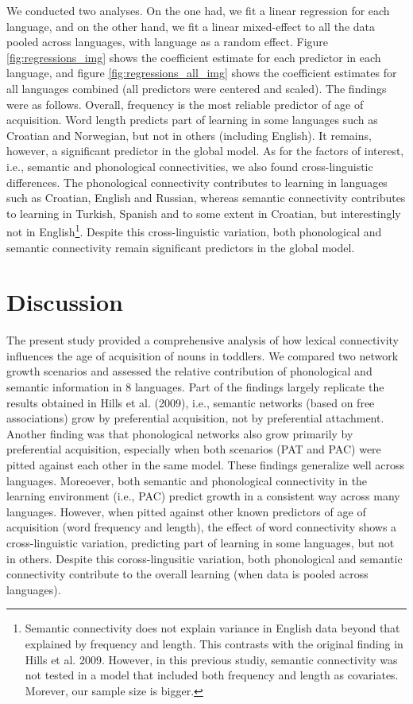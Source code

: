 \documentclass[10pt, letterpaper]{article}
\begin{document}
We conducted two analyses. On the one had, we fit a linear regression
for each language, and on the other hand, we fit a linear mixed-effect
to all the data pooled across languages, with language as a random
effect. Figure \ref{fig:regressions_img} shows the coefficient estimate
for each predictor in each language, and figure
\ref{fig:regressions_all_img} shows the coefficient estimates for all
languages combined (all predictors were centered and scaled). The
findings were as follows. Overall, frequency is the most reliable
predictor of age of acquisition. Word length predicts part of learning
in some languages such as Croatian and Norwegian, but not in others
(including English). It remains, however, a significant predictor in the
global model. As for the factors of interest, i.e., semantic and
phonological connectivities, we also found cross-linguistic differences.
The phonological connectivity contributes to learning in languages such
as Croatian, English and Russian, whereas semantic connectivity
contributes to learning in Turkish, Spanish and to some extent in
Croatian, but interestingly not in
English\footnote{Semantic connectivity does not explain variance in English data beyond that explained by frequency and length. This contrasts with the original finding in Hills et al. 2009. However, in this previous studiy, semantic connectivity was not tested in a model that included both frequency and length as covariates. Morever, our sample size is bigger.}.
Despite this cross-linguistic variation, both phonological and semantic
connectivity remain significant predictors in the global model.

\section{Discussion}\label{discussion}

The present study provided a comprehensive analysis of how lexical
connectivity influences the age of acquisition of nouns in toddlers. We
compared two network growth scenarios and assessed the relative
contribution of phonological and semantic information in 8 languages.
Part of the findings largely replicate the results obtained in Hills et
al. (2009), i.e., semantic networks (based on free associations) grow by
preferential acquisition, not by preferential attachment. Another
finding was that phonological networks also grow primarily by
preferential acquisition, especially when both scenarios (PAT and PAC)
were pitted against each other in the same model. These findings
generalize well across languages. Moreoever, both semantic and
phonological connectivity in the learning environment (i.e., PAC)
predict growth in a consistent way across many languages. However, when
pitted against other known predictors of age of acquisition (word
frequency and length), the effect of word connectivity shows a
cross-linguistic variation, predicting part of learning in some
languages, but not in others. Despite this coross-lingusitic variation,
both phonological and semantic connectivity contribute to the overall
learning (when data is pooled across languages).
\end{document}
